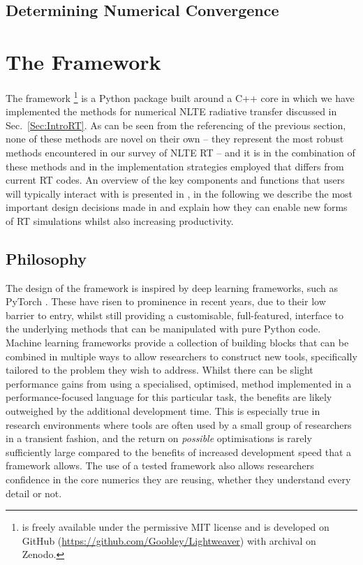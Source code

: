 \subsection{Determining Numerical Convergence}

\section{The \Lw{} Framework}

The \Lw{} framework \citep{Osborne2021, LightweaverZenodo}\footnote{\Lw{} is freely available under the permissive MIT license and is developed on GitHub (\url{https://github.com/Goobley/Lightweaver}) with archival on Zenodo.} is a Python package built around a C++ core in which we have implemented the methods for numerical NLTE radiative transfer discussed in Sec.~\ref{Sec:IntroRT}.
As can be seen from the referencing of the previous section, none of these methods are novel on their own -- they represent the most robust methods encountered in our survey of NLTE RT -- and it is in the combination of these methods and in the implementation strategies employed that \Lw{} differs from current \Sota{} RT codes.
An overview of the key components and functions that users will typically interact with is presented in \citet{Osborne2021}, in the following we describe the most important design decisions made in \Lw{} and explain how they can enable new forms of RT simulations whilst also increasing productivity.

\subsection{Philosophy}

The design of the \Lw{} framework is inspired by deep learning frameworks, such as PyTorch \citep{PyTorch}.
These have risen to prominence in recent years, due to their low barrier to entry, whilst still providing a customisable, full-featured, interface to the underlying methods that can be manipulated with pure Python code.
Machine learning frameworks provide a collection of building blocks that can be combined in multiple ways to allow researchers to construct new tools, specifically tailored to the problem they wish to address.
Whilst there can be slight performance gains from using a specialised, optimised, \Sota{} method implemented in a performance-focused language for this particular task, the benefits are likely outweighed by the additional development time.
This is especially true in research environments where tools are often used by a small group of researchers in a transient fashion, and the return on \emph{possible} optimisations is rarely sufficiently large compared to the benefits of increased development speed that a framework allows.
The use of a tested framework also allows researchers confidence in the core numerics they are reusing, whether they understand every detail or not.

